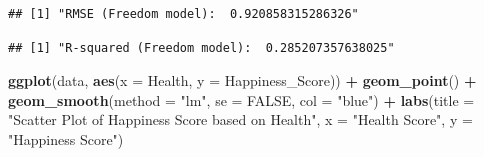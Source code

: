 \documentclass[
  11pt,
]{article}
\newenvironment{Shaded}{\begin{snugshade}}{\end{snugshade}}
\newcommand{\AttributeTok}[1]{\textcolor[rgb]{0.13,0.29,0.53}{#1}}
\newcommand{\ConstantTok}[1]{\textcolor[rgb]{0.56,0.35,0.01}{#1}}
\newcommand{\DecValTok}[1]{\textcolor[rgb]{0.00,0.00,0.81}{#1}}
\newcommand{\FunctionTok}[1]{\textcolor[rgb]{0.13,0.29,0.53}{\textbf{#1}}}
\newcommand{\NormalTok}[1]{#1}
\newcommand{\OtherTok}[1]{\textcolor[rgb]{0.56,0.35,0.01}{#1}}
\newcommand{\SpecialCharTok}[1]{\textcolor[rgb]{0.81,0.36,0.00}{\textbf{#1}}}
\newcommand{\StringTok}[1]{\textcolor[rgb]{0.31,0.60,0.02}{#1}}
\begin{document}
\begin{Shaded}
\end{Shaded}

\begin{verbatim}
## [1] "RMSE (Freedom model):  0.920858315286326"
\end{verbatim}

\begin{Shaded}
\end{Shaded}

\begin{verbatim}
## [1] "R-squared (Freedom model):  0.285207357638025"
\end{verbatim}

\begin{Shaded}
\begin{Highlighting}[]
\FunctionTok{ggplot}\NormalTok{(data, }\FunctionTok{aes}\NormalTok{(}\AttributeTok{x =}\NormalTok{ Health, }\AttributeTok{y =}\NormalTok{ Happiness\_Score)) }\SpecialCharTok{+}
  \FunctionTok{geom\_point}\NormalTok{() }\SpecialCharTok{+}
  \FunctionTok{geom\_smooth}\NormalTok{(}\AttributeTok{method =} \StringTok{"lm"}\NormalTok{, }\AttributeTok{se =} \ConstantTok{FALSE}\NormalTok{, }\AttributeTok{col =} \StringTok{"blue"}\NormalTok{) }\SpecialCharTok{+}
  \FunctionTok{labs}\NormalTok{(}\AttributeTok{title =} \StringTok{"Scatter Plot of Happiness Score based on Health"}\NormalTok{, }
       \AttributeTok{x =} \StringTok{"Health Score"}\NormalTok{, }
       \AttributeTok{y =} \StringTok{"Happiness Score"}\NormalTok{)}
\end{Highlighting}
\end{Shaded}
\end{document}
